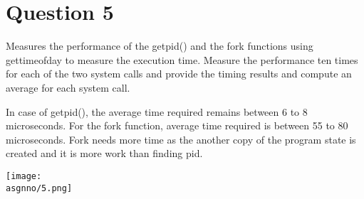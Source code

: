 \documentclass[main.tex]{subfiles}
\begin{document}
\section{Question 5}

Measures the performance of the getpid()  and the fork functions using
gettimeofday to measure the execution time. Measure the performance ten times
for each of the two system calls and provide the timing results and compute an
average for each system call.



In case of getpid(), the average time required remains between 6 to 8
microseconds. For the fork function, average time required is between 55 to 80
microseconds. Fork needs more time as the another copy of the program state is
created and it is more work than finding pid.

\centering\texttt{[image: \\asgnno/5.png]}
\clearpage
\end{document}
